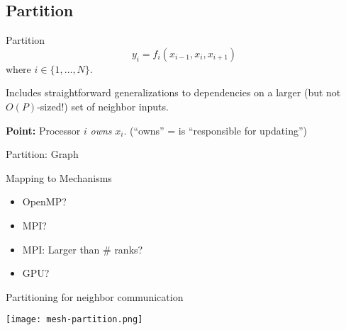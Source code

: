 \documentclass[english,compress]{beamer}
\begin{document}
\subsection{Partition}
\begin{frame}{Partition}
  {\Huge
  \[
    y_i = f_i(x_{i-1}, x_i, x_{i+1})
  \]}
  where $i\in\{1,\dots,N\}$.

  \pause
  \bigskip
  Includes straightforward
  generalizations to dependencies on a larger (but
  not $O(P)$-sized!) set of neighbor inputs.

  \pause
  \bigskip
  \textbf{Point:} Processor $i$ \emph{owns} $x_i$. (``owns'' = is
  ``responsible for updating'')
\end{frame}
\begin{frame}{Partition: Graph}
  \begin{center}
  \end{center}
\end{frame}
\begin{frame}{Mapping to Mechanisms}
  \begin{itemize}[<+->]
    \item OpenMP?
    \item MPI?
    \item MPI: Larger than \# ranks?
    \item GPU?
  \end{itemize}
\end{frame}
\begin{frame}{Partitioning for neighbor communication}
  \begin{center}
    \texttt{[image: mesh-partition.png]}
  \end{center}
  \uncover<+>{}
\end{frame}

\questionframe{}
\imagecreditslide
\end{document}
